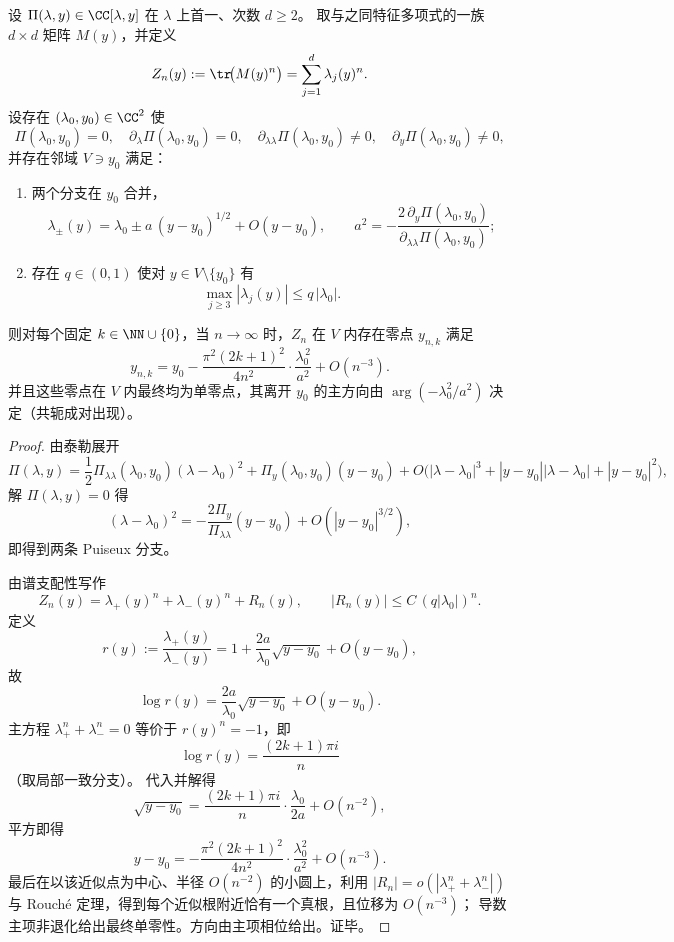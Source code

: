 \begin{theorem}\label{thm:xi-simple-leyang-edge-n2-quantization}
设 \(\Pi(\lambda,y)\in\CC[\lambda,y]\) 在 \(\lambda\) 上首一、次数 \(d\ge 2\)。
取与之同特征多项式的一族 \(d\times d\) 矩阵 \(M(y)\)，并定义
\[
Z_n(y):=\tr\!\bigl(M(y)^n\bigr)=\sum_{j=1}^{d}\lambda_j(y)^n.
\]
设存在 \((\lambda_0,y_0)\in\CC^2\) 使
\[
\Pi(\lambda_0,y_0)=0,\quad
\partial_\lambda\Pi(\lambda_0,y_0)=0,\quad
\partial_{\lambda\lambda}\Pi(\lambda_0,y_0)\neq 0,\quad
\partial_y\Pi(\lambda_0,y_0)\neq 0,
\]
并存在邻域 \(V\ni y_0\) 满足：
\begin{enumerate}
  \item 两个分支在 \(y_0\) 合并，
  \[
  \lambda_\pm(y)=\lambda_0\pm a\,(y-y_0)^{1/2}+O(y-y_0),
  \qquad
  a^2=-\frac{2\,\partial_y\Pi(\lambda_0,y_0)}{\partial_{\lambda\lambda}\Pi(\lambda_0,y_0)};
  \]
  \item 存在 \(q\in(0,1)\) 使对 \(y\in V\setminus\{y_0\}\) 有
  \[
  \max_{j\ge 3}|\lambda_j(y)|\le q\,|\lambda_0|.
  \]
\end{enumerate}
则对每个固定 \(k\in\NN\cup\{0\}\)，当 \(n\to\infty\) 时，\(Z_n\) 在 \(V\) 内存在零点 \(y_{n,k}\) 满足
\[
y_{n,k}
=
y_0
-\frac{\pi^2(2k+1)^2}{4n^2}\cdot\frac{\lambda_0^{\,2}}{a^2}
+O(n^{-3}).
\]
并且这些零点在 \(V\) 内最终均为单零点，其离开 \(y_0\) 的主方向由
\(\arg(-\lambda_0^2/a^2)\) 决定（共轭成对出现）。
\end{theorem}
\begin{proof}
由泰勒展开
\[
\Pi(\lambda,y)
=
\frac12\Pi_{\lambda\lambda}(\lambda_0,y_0)(\lambda-\lambda_0)^2
+\Pi_y(\lambda_0,y_0)(y-y_0)
+O\!\bigl(|\lambda-\lambda_0|^3+|y-y_0||\lambda-\lambda_0|+|y-y_0|^2\bigr),
\]
解 \(\Pi(\lambda,y)=0\) 得
\[
(\lambda-\lambda_0)^2
=
-\frac{2\Pi_y}{\Pi_{\lambda\lambda}}(y-y_0)+O(|y-y_0|^{3/2}),
\]
即得到两条 Puiseux 分支。

由谱支配性写作
\[
Z_n(y)=\lambda_+(y)^n+\lambda_-(y)^n+R_n(y),
\qquad
|R_n(y)|\le C\,(q|\lambda_0|)^n.
\]
定义
\[
r(y):=\frac{\lambda_+(y)}{\lambda_-(y)}
=1+\frac{2a}{\lambda_0}\sqrt{y-y_0}+O(y-y_0),
\]
故
\[
\log r(y)=\frac{2a}{\lambda_0}\sqrt{y-y_0}+O(y-y_0).
\]
主方程 \(\lambda_+^n+\lambda_-^n=0\) 等价于 \(r(y)^n=-1\)，即
\[
\log r(y)=\frac{(2k+1)\pi i}{n}
\]
（取局部一致分支）。
代入并解得
\[
\sqrt{y-y_0}
=
\frac{(2k+1)\pi i}{n}\cdot\frac{\lambda_0}{2a}+O(n^{-2}),
\]
平方即得
\[
y-y_0
=
-\frac{\pi^2(2k+1)^2}{4n^2}\cdot\frac{\lambda_0^2}{a^2}
+O(n^{-3}).
\]
最后在以该近似点为中心、半径 \(O(n^{-2})\) 的小圆上，利用
\(
|R_n|=o(|\lambda_+^n+\lambda_-^n|)
\)
与 Rouché 定理，得到每个近似根附近恰有一个真根，且位移为 \(O(n^{-3})\)；
导数主项非退化给出最终单零性。方向由主项相位给出。证毕。
\end{proof}

